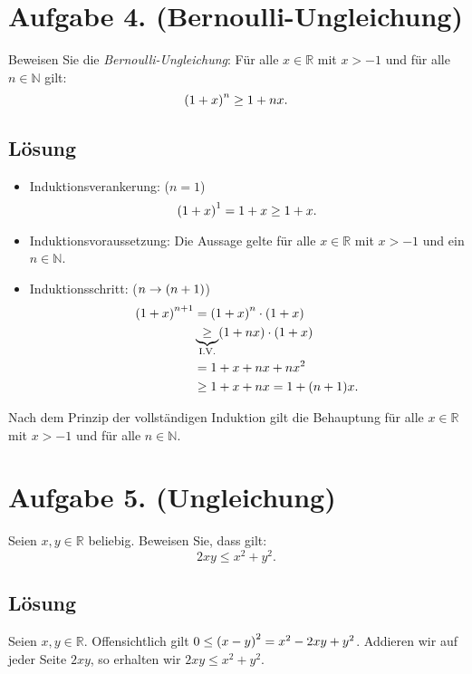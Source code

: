 \documentclass[german,12pt]{homework}
\newcommand{\NN}{\mathbb{N}}
\newcommand{\RR}{\mathbb{R}}
\DeclarePairedDelimiter{\enbrace}{(}{)}
\begin{document}
    \section*{Aufgabe 4. (Bernoulli-Ungleichung)}

    \begin{problem}
        Beweisen Sie die \emph{Bernoulli-Ungleichung}: Für alle \(x \in \RR\) mit \(x > -1\) und für alle \(n \in \NN\) gilt:
        \[\enbrace*{1 + x}^n \ge 1 + nx.\]
    \end{problem}

    \subsection*{Lösung}
    \begin{itemize}
        \item Induktionsverankerung: (\(n = 1\))
        \[\enbrace*{1 + x}^1 = 1 + x \ge 1 + x.\]
        \item Induktionsvoraussetzung: Die Aussage gelte für alle \(x \in \RR\) mit \(x > -1\) und ein \(n \in \NN\).
        \item Induktionsschritt: (\(n \to \enbrace*{n + 1}\))
        \begin{align*}
            \enbrace*{1 + x}^{n + 1} &= \enbrace*{1 + x}^n \cdot \enbrace*{1 + x}\\
            &\underbrace{\ge}_\text{I.V.} \enbrace*{1 + nx} \cdot \enbrace*{1 + x}\\
            &= 1 + x + nx + nx^2\\
            &\ge 1 + x + nx = 1 + \enbrace*{n + 1}x.
        \end{align*}
    \end{itemize}
    Nach dem Prinzip der vollständigen Induktion gilt die Behauptung für alle \(x \in \RR\) mit \(x > -1\) und für alle \(n \in \NN\).

    \section*{Aufgabe 5. (Ungleichung)}

    \begin{problem}
        Seien \(x, y \in \RR\) beliebig. Beweisen Sie, dass gilt:
        \[2xy \le x^2 + y^2.\]
    \end{problem}

    \subsection*{Lösung} Seien \(x, y \in \RR\). Offensichtlich gilt \(0 \le \enbrace*{x - y}^2 = x^2 - 2xy + y^2\). Addieren wir auf jeder Seite \(2xy\), so erhalten wir \(2xy \le x^2 + y^2\).
\end{document}
